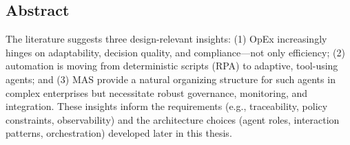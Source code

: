 
\begin{centering}
\section*{Abstract}
\end{centering}
The literature suggests three design-relevant insights: (1) OpEx increasingly hinges on adaptability, decision quality, and compliance—not only efficiency; (2) automation is moving from deterministic scripts (RPA) to adaptive, tool-using agents; and (3) MAS provide a natural organizing structure for such agents in complex enterprises but necessitate robust governance, monitoring, and integration. These insights inform the requirements (e.g., traceability, policy constraints, observability) and the architecture choices (agent roles, interaction patterns, orchestration) developed later in this thesis.
\newpage

\tableofcontents
\clearpage



\renewcommand{\nomname}{List of Abbreviations}
\setlength{\nomlabelwidth}{.25\hsize}
\renewcommand{\nomlabel}[1]{#1 \dotfill}
\setlength{\nomitemsep}{-\parsep}
{\small \printnomenclature}
\clearpage
{}